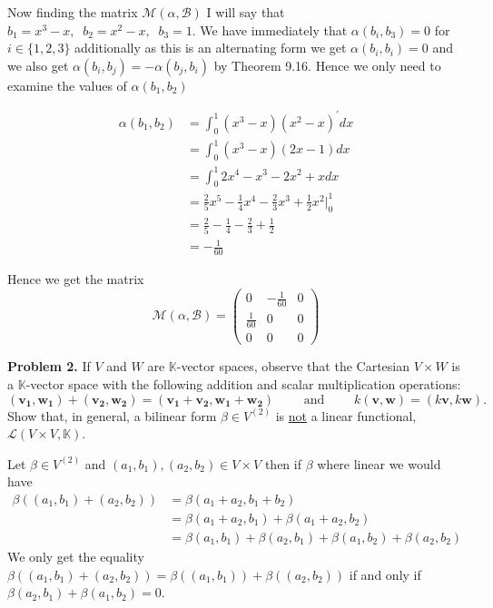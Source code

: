 \documentclass[letter,12pt]{article}
\newcommand{\K}{\mathbb{K}}
\newcommand{\Lin}{\mathcal{L}}
\newcommand{\Mat}{\mathcal{M}}
\newcommand{\Bas}{\mathcal{B}}
\begin{document}
Now finding the matrix $\Mat (\alpha ,\Bas)$ I will say that $b_1=x^3-x,\;\; b_2 =x^2-x,\;\;b_3=1$. We have immediately that $\alpha(b_i,b_3)=0$ for $i\in \{1,2,3\}$ additionally as this is an alternating form we get $\alpha(b_i,b_i)=0$ and we also get $\alpha(b_i,b_j)=-\alpha(b_j,b_i)$ by Theorem 9.16. Hence we only need to examine the values of $\alpha(b_1,b_2)$

\begin{align*}
    \alpha(b_1,b_2)&= \int_0^1(x^3-x)(x^2-x)^\prime dx\\
    &= \int_0^1(x^3-x)(2x-1)dx\\
    &= \int_0^1 2x^4-x^3-2x^2+xdx\\
    &= \frac{2}{5}x^5-\frac{1}{4}x^4-\frac{2}{3}x^3+\frac{1}{2}x^2\Big|_0^1\\
    &= \frac{2}{5}-\frac{1}{4}-\frac{2}{3}+\frac{1}{2}\\
    &= -\frac{1}{60}
\end{align*}

Hence we get the matrix \[\Mat(\alpha ,\Bas)=\begin{pmatrix}
    0 & -\frac{1}{60} & 0\\
    \frac{1}{60} & 0 & 0\\
    0 & 0 & 0
\end{pmatrix}\]




\newpage


\begin{tcolorbox}
  \textbf{Problem 2.} If $V$ and $W$ are $\K$-vector spaces, observe that the Cartesian $V \times W$ is a $\K$-vector space with the following addition and scalar multiplication operations:
  $$(\mathbf{v_1},\mathbf{w_1})+(\mathbf{v_2},\mathbf{w_2}) = (\mathbf{v_1}+\mathbf{v_2},\mathbf{w_1}+\mathbf{w_2}) \qquad \text{ and } \qquad k(\mathbf{v},\mathbf{w}) = (k \mathbf{v}, k \mathbf{w}).$$
  Show that, in general, a bilinear form $\beta \in V^{(2)}$ is \underline{not} a linear functional, $\Lin(V \times V, \K)$.
\end{tcolorbox}

Let $\beta\in V^{(2)}$ and $(a_1,b_1),(a_2,b_2)\in V\times V$ then if $\beta$ where linear we would have 
\begin{align*}
    \beta((a_1,b_1)+(a_2,b_2))&=\beta(a_1+a_2,b_1+b_2)\\
    &=\beta(a_1+a_2,b_1)+\beta(a_1+a_2,b_2)\\
    &=\beta(a_1,b_1)+\beta(a_2,b_1)+\beta(a_1,b_2)+\beta(a_2,b_2)
\end{align*}
We only get the equality $ \beta((a_1,b_1)+(a_2,b_2))=\beta((a_1,b_1))+\beta((a_2,b_2))$ if and only if $\beta(a_2,b_1)+\beta(a_1,b_2)=0$. 
\end{document}
